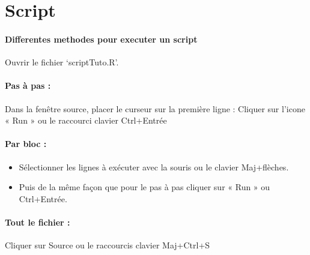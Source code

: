 \section{Script}
\paragraph{Differentes methodes pour executer un script}
Ouvrir le fichier ‘scriptTuto.R'.
\paragraph{Pas à pas :}
Dans la fenêtre source, placer le curseur sur la première ligne :
Cliquer sur l'icone « Run » ou le raccourci clavier Ctrl+Entrée
\paragraph{Par bloc :}
\begin{itemize}
	\item 	Sélectionner les lignes à exécuter avec la souris ou le clavier Maj+flèches.
	\item 	Puis de la même façon que pour le pas à pas cliquer sur « Run » ou Ctrl+Entrée.
\end{itemize}

\paragraph{Tout le fichier :}
	Cliquer sur Source ou le raccourcis clavier Maj+Ctrl+S



